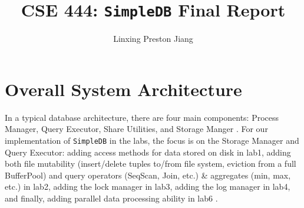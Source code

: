 \documentclass[12pt]{myland}
\def\<#1>{\texttt{#1}}
\begin{document}
\title{CSE 444: \<SimpleDB> Final Report}
\author{Linxing Preston Jiang}
\maketitle

\section{Overall System Architecture}
	\label{overview}

	\par In a typical database architecture, there are four main components: Process Manager, Query Executor, Share
Utilities, and Storage Manger \cite{lecture3}. For our implementation of \<SimpleDB> in the labs,
the focus is on the Storage Manager and Query Executor: adding access methods for data stored on disk in lab1, adding both file
mutability (insert/delete tuples to/from file system, eviction from a full BufferPool) and query operators (SeqScan, Join,
etc.) \& aggregates (min, max, etc.) in lab2, adding the lock manager in lab3, adding the log manager in lab4, and finally, adding
parallel data processing ability in lab6 \cite{db}.
\end{document}
